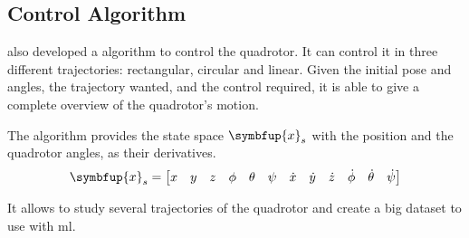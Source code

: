 
\subsection{Control Algorithm}

\citet{geronel2023} also developed a \matlab algorithm to control the quadrotor. It can control it in three different trajectories: rectangular, circular and linear.
Given the initial pose and angles, the trajectory wanted, and the control required, it is able to give a complete overview of the quadrotor's motion.

The algorithm provides the state space \(\symbfup{x}_s\) with the position and the quadrotor angles, as their derivatives.
%
\begin{equation}\setcounter{MaxMatrixCols}{13}
    \symbfup{x}_s =
    \begin{bmatrix}
        x&y&z&\phi&\theta&\psi&\dot{x}&\dot{y}&\dot{z}&\dot{\phi}&\dot{\theta}&\dot{\psi}
    \end{bmatrix}        
    \label{eq:xs_vector_matlab}
\end{equation}

It allows to study several trajectories of the quadrotor and create a big dataset to use with \gls*{ml}.